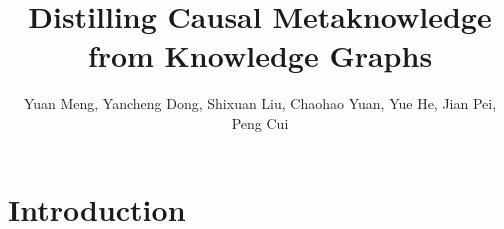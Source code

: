 \documentclass[11pt]{article}
\begin{document}
\title{Distilling Causal Metaknowledge from Knowledge Graphs}


\author{Yuan Meng, Yancheng Dong, Shixuan Liu, Chaohao Yuan, Yue He, Jian Pei, Peng Cui}%



\maketitle

\begin{abstract}

\end{abstract}


\section{Introduction}
\label{section:introduction}

\end{document}
